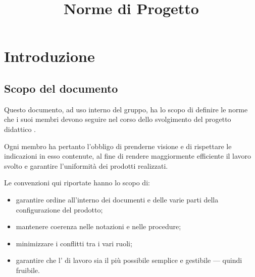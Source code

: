 


\author{\LS}
\supervisor{\GG}
\dest{\ALL}
\title{Norme di Progetto}


\maketitle

\tableofcontents






\section{Introduzione}


\subsection{Scopo del documento}
Questo documento, ad uso interno del gruppo, ha lo scopo di definire le norme che i suoi membri devono seguire nel corso dello svolgimento del progetto didattico \proj.

Ogni membro ha pertanto l'obbligo di prenderne visione e di rispettare le indicazioni in esso contenute, al fine di rendere maggiormente efficiente il lavoro svolto e garantire l'uniformità dei prodotti realizzati.

Le convenzioni qui riportate hanno lo scopo di:
\begin{itemize}
	\item garantire ordine all'interno dei documenti e delle varie parti della configurazione del prodotto;
	\item mantenere coerenza nelle notazioni e nelle procedure;
	\item minimizzare i conflitti tra i vari ruoli;
	\item garantire che l' di lavoro sia il più possibile semplice e gestibile --- quindi fruibile.
\end{itemize}


